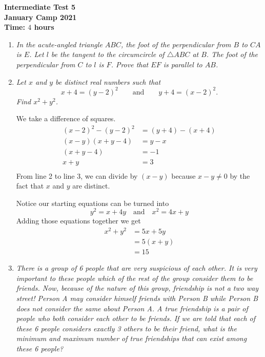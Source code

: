 \documentclass{article}
\begin{document}
\thispagestyle{empty}

\begin{center}
  \textbf{\Large Intermediate Test 5}
  \\ \vspace{1em}
  \textbf{\large January Camp 2021}
  \\ \vspace{1em}
  \textbf{\large Time: $4$ hours}
\end{center}

\vspace{12pt}

\begin{enumerate}[1.]

\item %
{\itshape In the acute-angled triangle $ABC$, the foot of the perpendicular from $B$ to $CA$ is $E$. Let $l$ be the tangent to the circumcircle of $\triangle ABC$ at $B$. The foot of the perpendicular from $C$ to $l$ is $F$. Prove that $EF$ is parallel to $AB$.}


\item %
{\itshape Let $x$ and $y$ be distinct real numbers such that $$x + 4 = (y - 2)^2 \qquad\text{and}\qquad y + 4 = (x - 2)^2.$$
Find $x^2 + y^2$.}

We take a difference of squares.
\begin{align*}
(x - 2)^2 - (y - 2)^2 &= (y + 4) - (x + 4)\\
(x - y)(x + y - 4) &= y - x\\
(x + y - 4) &= -1\\
x + y &= 3\\
\end{align*}
From line 2 to line 3, we can divide by $(x - y)$ because $x - y \neq 0$ by the fact that $x$ and $y$ are distinct.

Notice our starting equations can be turned into $$y^2 = x + 4y \quad \text{and}\quad x^2 = 4x + y$$ Adding those equations together we get
\begin{align*}
x^2 + y^2 &= 5x + 5y\\
&= 5(x + y)\\
&=15
\end{align*}

\item %
{\itshape There is a group of 6 people that are very suspicious of each other. It is very important to these people which of the rest of the group consider them to be friends. Now, because of the nature of this group, friendship is not a two way street! Person A may consider himself friends with Person B while Person B does not consider the same about Person A. A true friendship is a pair of people who both consider each other to be friends. If we are told that each of these 6 people considers exactly 3 others to be their friend, what is the minimum and maximum number of true friendships that can exist among these 6 people?}



\end{enumerate}
\end{document}
